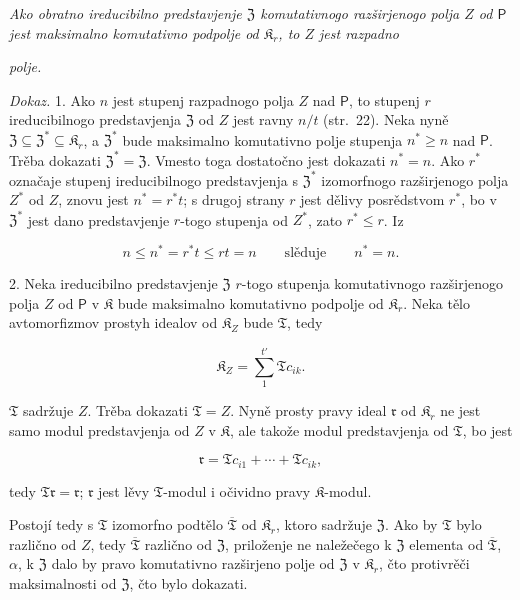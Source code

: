 \documentclass[11pt]{article}
\begin{document}
\emph{Ako obratno ireducibilno predstavjenje \(\mathfrak Z\) komutativnogo razširjenogo polja \(Z\) od \(\mathsf P\) jest maksimalno komutativno podpolje od \(\mathfrak K_r\), to \(Z\) jest razpadno}

\emph{polje.}

\emph{Dokaz.} 1. Ako \(n\) jest stupenj razpadnogo polja \(Z\) nad \(\mathsf P\), to stupenj \(r\) ireducibilnogo predstavjenja \(\mathfrak Z\) od \(Z\) jest ravny \(n/t\) (str.~22). Neka nyně \(\mathfrak Z\subseteq\mathfrak Z^*\subseteq\mathfrak K_r\), a \(\mathfrak Z^*\) bude maksimalno komutativno polje stupenja \(n^*\geq n\) nad \(\mathsf P\). Trěba dokazati \(\mathfrak Z^*=\mathfrak Z\). Vmesto toga dostatočno jest dokazati \(n^*=n\). Ako \(r^*\) označaje stupenj ireducibilnogo predstavjenja s \(\mathfrak Z^*\) izomorfnogo razširjenogo polja \(Z^*\) od \(Z\), znovu jest \(n^*=r^*t\); s drugoj strany \(r\) jest dělivy posrědstvom \(r^*\), bo v \(\mathfrak Z^*\) jest dano predstavjenje \(r\)-togo stupenja od \(Z^*\), zato \(r^*\leq r\). Iz

\[
n\leq n^*=r^*t\leq rt=n \qquad\text{slěduje}\qquad n^*=n.
\]

2. Neka ireducibilno predstavjenje \(\mathfrak Z\) \(r\)-togo stupenja komutativnogo razširjenogo polja \(Z\) od \(\mathsf P\) v \(\mathfrak K\) bude maksimalno komutativno podpolje od \(\mathfrak K_r\). Neka tělo avtomorfizmov prostyh idealov od \(\mathfrak K_Z\) bude \(\mathfrak T\), tedy

\[
\mathfrak K_Z=\sum_{1}^{t'}\mathfrak T c_{ik}.
\]

\(\mathfrak T\) sadržuje \(Z\). Trěba dokazati \(\mathfrak T=Z\). Nyně prosty pravy ideal \(\mathfrak r\) od \(\mathfrak K_r\) ne jest samo modul predstavjenja od \(Z\) v \(\mathfrak K\), ale takože modul predstavjenja od \(\mathfrak T\), bo jest

\[
\mathfrak r=\mathfrak T c_{i1}+\cdots+\mathfrak T c_{ik},
\]

tedy \(\mathfrak T\mathfrak r=\mathfrak r\); \(\mathfrak r\) jest lěvy \(\mathfrak T\)-modul i očividno pravy \(\mathfrak K\)-modul.

Postojí tedy s \(\mathfrak T\) izomorfno podtělo \(\overline{\mathfrak T}\) od \(\mathfrak K_r\), ktoro sadržuje \(\mathfrak Z\). Ako by \(\mathfrak T\) bylo različno od \(Z\), tedy \(\overline{\mathfrak T}\) različno od \(\mathfrak Z\), priloženje ne naležečego k \(\mathfrak Z\) elementa od \(\overline{\mathfrak T}\), \(\alpha\), k \(\mathfrak Z\) dalo by pravo komutativno razširjeno polje od \(\mathfrak Z\) v \(\mathfrak K_r\), čto protivrěči maksimalnosti od \(\mathfrak Z\), čto bylo dokazati.
\end{document}
